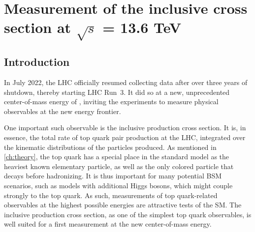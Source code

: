 \chapter{Measurement of the inclusive \ttbartitle cross section at \texorpdfstring{$\sqrt{s}$}{sqrt(s)} = 13.6 TeV}
\label{ch:ttxs}


\section{Introduction}



In July 2022, the LHC officially resumed collecting data after over three years of shutdown, thereby starting LHC Run~3. It did so at a new, unprecedented center-of-mass energy of \sqrtsRIII, inviting the experiments to measure physical observables at the new energy frontier.

One important such observable is the inclusive \ttbar production cross section. It is, in essence, the total rate of top quark pair production at the LHC, integrated over the kinematic distributions of the particles produced. As mentioned in \cref{ch:theory}, the top quark has a special place in the standard model as the heaviest known elementary particle, as well as the only colored particle that decays before hadronizing. 
It is thus important for many potential BSM scenarios, such as models with additional Higgs bosons, which might couple strongly to the top quark. 
As such, measurements of top quark-related observables at the highest possible energies are attractive tests of the SM. The inclusive \ttbar production cross section, as one of the simplest top quark observables, is well suited for a first measurement at the new center-of-mass energy.

